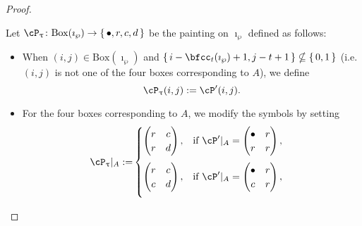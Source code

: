 \documentclass[12pt,a4paper]{amsart}
\numberwithin{equation}{section}
\theoremstyle{remark}
\def\BOX#1{\mathrm{Box}(#1)}
\begin{document}
\begin{proof}
\begin{description}
    Let $\cP_{\uptau}\colon \BOX{\imath_{\wp}}\rightarrow \set{\bullet,r,c,d}$
          be the painting on $\imath_{\wp}$ defined as follows:
          \begin{itemize}
            \item When $(i,j)\in \BOX{\imath_{\wp}}$ and
            $\set{i-\bfcc_{t}(\imath_{\wp})+1, j-t+1}\nsubseteq \set{0,1}$
            (i.e. $(i,j)$ is not one of the four boxes corresponding to
            $A$), we define
            \[
              \cP_{\uptau}(i,j):= \cP'(i,j).
            \]

            \item For the four boxes corresponding to $A$, we modify the symbols by
            setting
            \begin{equation} \label{eq:modP}
              \begin{split}
              \cP_{\uptau}|_A  :=&
                \begin{cases}
                  \begin{pmatrix}
                    r & c\\
                    r & d
                  \end{pmatrix}, & \text{if } \cP'|_A =
                  \begin{pmatrix}
                    \bullet & r\\
                    r & r
                  \end{pmatrix},\\[1.5em]
                  \begin{pmatrix}
                    r & c\\
                    c & d
                  \end{pmatrix}, & \text{if } \cP'|_A =
                  \begin{pmatrix}
                    \bullet & r\\
                    c & r
                  \end{pmatrix},\\[1.5em]

\end{cases}
\end{split}
\end{equation}
\end{itemize}
\end{description}
\end{proof}
\end{document}
